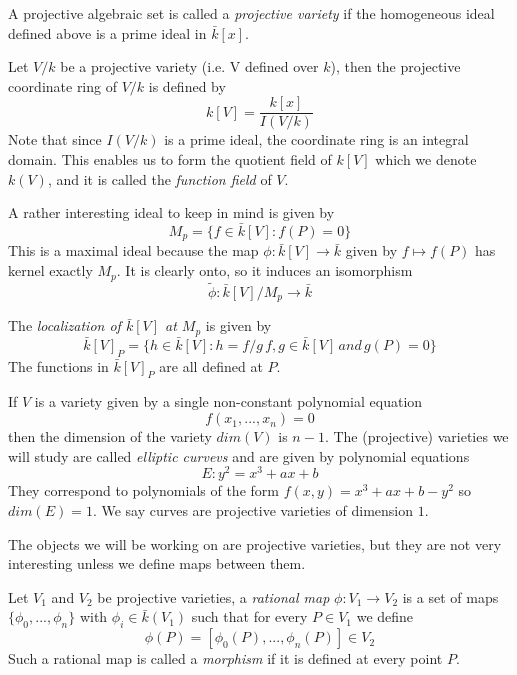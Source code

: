 \documentclass[a4paper,10pt]{amsart}
\begin{document}
\begin{mydef}
 A projective algebraic set is called a \emph{projective variety} if the homogeneous
ideal defined above is a prime ideal in $\bar{k}[x]$.
\end{mydef}

\begin{mydef}
 Let $V/k$ be a projective variety (i.e. V defined over $k$), then the projective coordinate
ring of $V/k$ is defined by
$$ k[V] = \frac{k[x]}{I(V/k)}$$
Note that since $I(V/k)$ is a prime ideal, the coordinate ring is an integral domain.
This enables us to form the quotient field of $k[V]$ which we denote $k(V)$, and it is called
the \emph{function field} of $V$.
\end{mydef}

A rather interesting ideal to keep in mind is given by
$$ M_p = \{ f\in \bar{k}[V] : f(P)=0 \} $$
This is a maximal ideal because the map $\phi: \bar{k}[V] \rightarrow \bar{k}$ given by
$ f \mapsto f(P) $ has kernel exactly $M_p$. It is clearly onto, so it induces an
isomorphism $$\tilde{\phi}: \bar{k}[V]/M_p \rightarrow \bar{k} $$

\begin{mydef}
 The \emph{localization of $\bar{k}[V]$ at $M_p$} is given by
$$ \bar{k}[V]_P = \{ h \in \bar{k}[V] : h = f/g\, f,g\in \bar{k}[V]\, and\, g(P)=0 \} $$
The functions in $\bar{k}[V]_P$ are all defined at $P$.
\end{mydef}

\begin{ex}
 If $V$ is a variety given by a single non-constant polynomial equation
$$f(x_1,...,x_n) = 0$$ 
then the dimension of the variety $dim(V)$ is $n-1$. The (projective) varieties
we will study are called \emph{elliptic curvevs} and are
given by polynomial equations
$$E: y^2 = x^3+ax+b$$
They correspond to polynomials of the form $f(x,y) = x^3+ax+b-y^2$ so $dim(E)=1$.
We say curves are projective varieties of dimension $1$.
\end{ex}


The objects we will be working on are projective varieties, but they are not
very interesting unless we define maps between them.

\begin{mydef}
 Let $V_1$ and $V_2$ be projective varieties, a \emph{rational map} $\phi: V_1 \rightarrow V_2$
is a set of maps $\{\phi_0,...,\phi_n\}$ with $\phi_i \in \bar{k}(V_1)$ such that for every
$P\in V_1$ we define
$$\phi(P) = [\phi_0(P),...,\phi_n(P)] \in V_2$$
Such a rational map is called a \emph{morphism} if it is defined at every point $P$.
\end{mydef}
\end{document}
